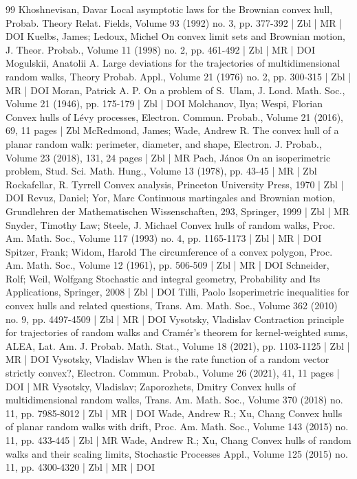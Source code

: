 \documentclass[10pt]{amsart}
\theoremstyle{definition}\newtheorem{defi}[theo]{Definition}\newtheorem{rema}[theo]{Remark}\newtheorem{exam}[theo]{Example}\newtheorem{exem}[theo]{Example}\newtheorem{nota}[theo]{Notation}
\begin{document}
\begin{thebibliography}{99}
Khoshnevisan, Davar Local asymptotic laws for the Brownian convex hull, Probab. Theory Relat. Fields, Volume 93 (1992) no. 3, pp. 377-392 | Zbl | MR | DOI
Kuelbs, James; Ledoux, Michel On convex limit sets and Brownian motion, J. Theor. Probab., Volume 11 (1998) no. 2, pp. 461-492 | Zbl | MR | DOI
Mogulskii, Anatolii A. Large deviations for the trajectories of multidimensional random walks, Theory Probab. Appl., Volume 21 (1976) no. 2, pp. 300-315 | Zbl | MR | DOI
Moran, Patrick A. P. On a problem of S. Ulam, J. Lond. Math. Soc., Volume 21 (1946), pp. 175-179 | Zbl | DOI
Molchanov, Ilya; Wespi, Florian Convex hulls of Lévy processes, Electron. Commun. Probab., Volume 21 (2016), 69, 11 pages | Zbl
McRedmond, James; Wade, Andrew R. The convex hull of a planar random walk: perimeter, diameter, and shape, Electron. J. Probab., Volume 23 (2018), 131, 24 pages | Zbl | MR
Pach, János On an isoperimetric problem, Stud. Sci. Math. Hung., Volume 13 (1978), pp. 43-45 | MR | Zbl
Rockafellar, R. Tyrrell Convex analysis, Princeton University Press, 1970 | Zbl | DOI
Revuz, Daniel; Yor, Marc Continuous martingales and Brownian motion, Grundlehren der Mathematischen Wissenschaften, 293, Springer, 1999 | Zbl | MR
Snyder, Timothy Law; Steele, J. Michael Convex hulls of random walks, Proc. Am. Math. Soc., Volume 117 (1993) no. 4, pp. 1165-1173 | Zbl | MR | DOI
Spitzer, Frank; Widom, Harold The circumference of a convex polygon, Proc. Am. Math. Soc., Volume 12 (1961), pp. 506-509 | Zbl | MR | DOI
Schneider, Rolf; Weil, Wolfgang Stochastic and integral geometry, Probability and Its Applications, Springer, 2008 | Zbl | DOI
Tilli, Paolo Isoperimetric inequalities for convex hulls and related questions, Trans. Am. Math. Soc., Volume 362 (2010) no. 9, pp. 4497-4509 | Zbl | MR | DOI
Vysotsky, Vladislav Contraction principle for trajectories of random walks and Cramér’s theorem for kernel-weighted sums, ALEA, Lat. Am. J. Probab. Math. Stat., Volume 18 (2021), pp. 1103-1125 | Zbl | MR | DOI
Vysotsky, Vladislav When is the rate function of a random vector strictly convex?, Electron. Commun. Probab., Volume 26 (2021), 41, 11 pages | DOI | MR
Vysotsky, Vladislav; Zaporozhets, Dmitry Convex hulls of multidimensional random walks, Trans. Am. Math. Soc., Volume 370 (2018) no. 11, pp. 7985-8012 | Zbl | MR | DOI
Wade, Andrew R.; Xu, Chang Convex hulls of planar random walks with drift, Proc. Am. Math. Soc., Volume 143 (2015) no. 11, pp. 433-445 | Zbl | MR
Wade, Andrew R.; Xu, Chang Convex hulls of random walks and their scaling limits, Stochastic Processes Appl., Volume 125 (2015) no. 11, pp. 4300-4320 | Zbl | MR | DOI
\end{thebibliography}
\end{document}
